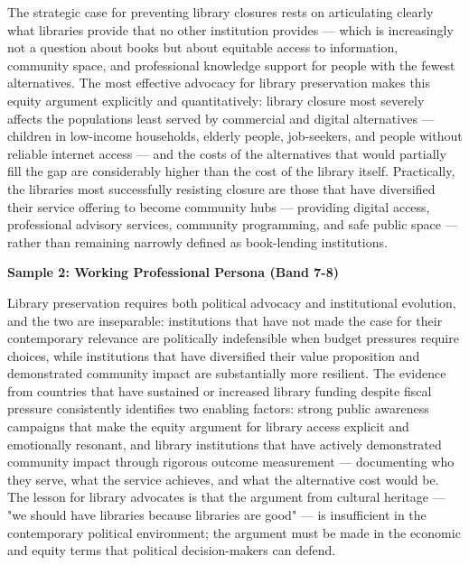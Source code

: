 The strategic case for preventing library closures rests on articulating clearly what libraries provide that no other institution provides — which is increasingly not a question about books but about equitable access to information, community space, and professional knowledge support for people with the fewest alternatives. The most effective advocacy for library preservation makes this equity argument explicitly and quantitatively: library closure most severely affects the populations least served by commercial and digital alternatives — children in low-income households, elderly people, job-seekers, and people without reliable internet access — and the costs of the alternatives that would partially fill the gap are considerably higher than the cost of the library itself. Practically, the libraries most successfully resisting closure are those that have diversified their service offering to become community hubs — providing digital access, professional advisory services, community programming, and safe public space — rather than remaining narrowly defined as book-lending institutions.

\textbf{Sample 2: Working Professional Persona (Band 7-8)}

Library preservation requires both political advocacy and institutional evolution, and the two are inseparable: institutions that have not made the case for their contemporary relevance are politically indefensible when budget pressures require choices, while institutions that have diversified their value proposition and demonstrated community impact are substantially more resilient. The evidence from countries that have sustained or increased library funding despite fiscal pressure consistently identifies two enabling factors: strong public awareness campaigns that make the equity argument for library access explicit and emotionally resonant, and library institutions that have actively demonstrated community impact through rigorous outcome measurement — documenting who they serve, what the service achieves, and what the alternative cost would be. The lesson for library advocates is that the argument from cultural heritage — "we should have libraries because libraries are good" — is insufficient in the contemporary political environment; the argument must be made in the economic and equity terms that political decision-makers can defend.

\separator


